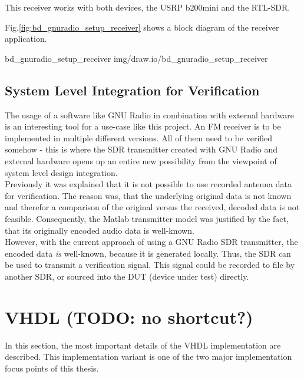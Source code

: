 This receiver works with both devices, the USRP b200mini and the RTL-SDR.

Fig.\ref{fig:bd_gnuradio_setup_receiver} shows a block diagram of the receiver application.

 {bd_gnuradio_setup_receiver} {img/draw.io/bd_gnuradio_setup_receiver}

\subsection{System Level Integration for Verification}

The usage of a software like GNU Radio in combination with external hardware is an interesting tool for a use-case like this project.
An FM receiver is to be implemented in multiple different versions.
All of them need to be verified somehow - this is where the SDR transmitter created with GNU Radio and external hardware opens up an entire new possibility from the viewpoint of system level design integration.\\

Previously it was explained that it is not possible to use recorded antenna data for verification.
The reason was, that the underlying original data is not known and therefor a comparison of the original versus the received, decoded data is not feasible.
Consequently, the Matlab transmitter model was justified by the fact, that its originally encoded audio data is well-known.\\

However, with the current approach of using a GNU Radio SDR transmitter, the encoded data \textit{is} well-known, because it is generated locally.
Thus, the SDR can be used to transmit a verification signal.
This signal could be recorded to file by another SDR, or sourced into the DUT (device under test) directly.


\section{VHDL (TODO: no shortcut?)}

In this section, the most important details of the VHDL implementation are described.
This implementation variant is one of the two major implementation focus points of this thesis.

